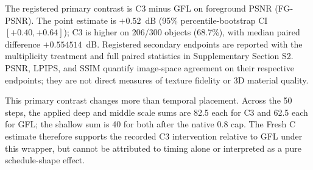 \documentclass[times,twocolumn,final]{elsarticle}
\providecommand{\DIFadd}[1]{{\protect\color{blue} \sf #1}} %
\providecommand{\DIFaddbegin}{} %
\providecommand{\DIFaddend}{} %
\begin{document}
  \DIFaddbegin \DIFadd{The registered primary contrast is }\DIFaddend C3   \DIFaddbegin \DIFadd{minus GFL on foreground PSNR (FG-PSNR). The point estimate is $+0.52$~dB (95\% percentile-bootstrap CI $[+0.40,+0.64]$); C3 is higher on 206/300 objects (68.7\%), with median paired difference $+0.554514$~dB. Registered secondary endpoints are reported with the multiplicity treatment and full paired statistics in Supplementary Section S2. PSNR, LPIPS, and SSIM quantify image-space agreement on their respective endpoints; they are not direct measures of texture fidelity or 3D material quality}\DIFaddend .

This   \DIFaddbegin \DIFadd{primary contrast changes more than temporal placement. Across the 50 steps, the applied deep and middle scale sums are 82.5 each for }\DIFaddend C3   \DIFaddbegin \DIFadd{and 62.5 each for GFL; the shallow sum is 40 for both after the native 0.8 cap. The Fresh C estimate therefore supports the recorded C3 intervention relative to GFL under this wrapper, but cannot be attributed to timing alone or interpreted as a pure schedule-shape effect}\DIFaddend .
\end{document}
